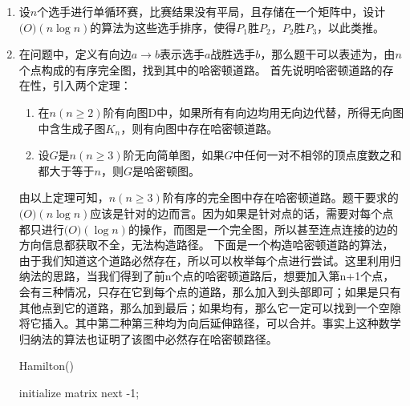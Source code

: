 \documentclass[12pt,a4paper]{article}
\makeatletter
\newtheorem*{solution}{Solution}
\theoremstyle{definition}
\renewenvironment{solution}[1][Solution] {\par\pushQED{\qed}\normalfont\topsep6\p@\@plus6\p@\relax\trivlist\item[\hskip\labelsep\bfseries#1\@addpunct{.}]\ignorespaces}{\popQED\endtrivlist\@endpefalse} \makeatother
\makeatother
\begin{document}
\begin{enumerate}
\item 设$n$个选手进行单循环赛，比赛结果没有平局，且存储在一个矩阵中，设计$\mathcal(O)(n\log n)$的算法为这些选手排序，使得$P_1$胜$P_2$，$P_2$胜$P_3$，以此类推。
\begin{solution}
	在问题中，定义有向边$a\to b$表示选手$a$战胜选手$b$，那么题干可以表述为，由$n$个点构成的有序完全图，找到其中的哈密顿道路。
	首先说明哈密顿道路的存在性，引入两个定理：
	\begin{enumerate}
		\item 在$n(n\geq2)$阶有向图D中，如果所有有向边均用无向边代替，所得无向图中含生成子图$K_n$，则有向图中存在哈密顿道路。
		\item 设$G$是$n(n\geq3)$阶无向简单图，如果$G$中任何一对不相邻的顶点度数之和都大于等于$n$，则$G$是哈密顿图。
	\end{enumerate}
	由以上定理可知，$n(n\geq3)$阶有序的完全图中存在哈密顿道路。题干要求的$\mathcal(O)(n\log n)$应该是针对的边而言。因为如果是针对点的话，需要对每个点都只进行$\mathcal(O)(\log n)$的操作，而图是一个完全图，所以甚至连点连接的边的方向信息都获取不全，无法构造路径。
	下面是一个构造哈密顿道路的算法，由于我们知道这个道路必然存在，所以可以枚举每个点进行尝试。这里利用归纳法的思路，当我们得到了前n个点的哈密顿道路后，想要加入第n+1个点，会有三种情况，只存在它到每个点的道路，那么加入到头部即可；如果是只有其他点到它的道路，那么加到最后；如果均有，那么它一定可以找到一个空隙将它插入。其中第二种第三种均为向后延伸路径，可以合并。事实上这种数学归纳法的算法也证明了该图中必然存在哈密顿路径。
	\begin{center}
	\begin{algorithm}[H]
		\caption{Hamilton()}
		initialize matrix next -1;\\
	\end{algorithm}


\end{center}
\end{solution}
\end{enumerate}
\end{document}
